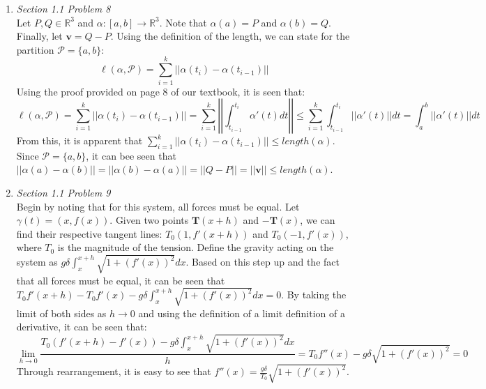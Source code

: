 \documentclass{article}
\begin{document}
\begin{enumerate}
\begin{enumerate}
\end{enumerate}

\item \textit{Section 1.1 Problem 8}\\
Let $P, Q \in \mathbb{R}^3$ and $\alpha:[a,b] \rightarrow \mathbb{R}^3$. 
Note that $\alpha(a) = P$ and $\alpha(b) = Q$.
Finally, let $\mathbf{v} = Q - P$. 
Using the definition of the length, we can state for the partition $\mathcal{P} = \{a,b\}$:
\begin{equation*}
\ell(\alpha,\mathcal{P}) = \displaystyle\sum_{i=1}^k||\alpha(t_i)-\alpha(t_{i-1})||
\end{equation*}
Using the proof provided on page 8 of our textbook, it is seen that:
\begin{equation*}
\ell(\alpha,\mathcal{P}) = \displaystyle\sum_{i=1}^k||\alpha(t_i)-\alpha(t_{i-1})|| = \displaystyle\sum_{i=1}^k\left|\left|\displaystyle\int_{t_{i-1}}^{t_i}\alpha'(t)dt\right|\right|
\leq \displaystyle\sum_{i=1}^k\displaystyle\int_{t_{i-1}}^{t_i}||\alpha'(t)||dt = \displaystyle\int_a^b||\alpha'(t)||dt
\end{equation*}
From this, it is apparent that $\displaystyle\sum_{i=1}^k||\alpha(t_i)-\alpha(t_{i-1})|| \leq length(\alpha)$.
Since $\mathcal{P} = \{a,b\}$, it can bee seen that $||\alpha(a)-\alpha(b)|| = ||\alpha(b) - \alpha(a)|| = ||Q-P|| = ||\mathbf{v}|| \leq length(\alpha)$.

\item \textit{Section 1.1 Problem 9}\\
Begin by noting that for this system, all forces must be equal.
Let $\gamma(t) = (x,f(x))$.
Given two points $\mathbf{T}(x+h)$ and $-\mathbf{T}(x)$, we can find their respective tangent lines: $T_0(1, f'(x+h))$ and $T_0(-1,f'(x))$,
where $T_0$ is the magnitude of the tension.
Define the gravity acting on the system as $g\delta\displaystyle\int_x^{x+h}\sqrt{1+(f'(x))^2}dx$.
Based on this step up and the fact that all forces must be equal, it can be seen that $T_0f'(x+h) - T_0f'(x)-g\delta\displaystyle\int_x^{x+h}\sqrt{1+(f'(x))^2}dx = 0$.
By taking the limit of both sides as $h\rightarrow 0$ and using the definition of a limit definition of a derivative, it can be seen that:
\begin{equation*}
\lim_{h\to0} \frac{T_0(f'(x+h)-f'(x))-g\delta\displaystyle\int_x^{x+h}\sqrt{1+(f'(x))^2}dx}{h} = T_0f''(x)-g\delta\sqrt{1+(f'(x))^2} = 0
\end{equation*}
Through rearrangement, it is easy to see that $f''(x)=\frac{g\delta}{T_0}\sqrt{1+(f'(x))^2}$.


\end{enumerate}
\end{document}
